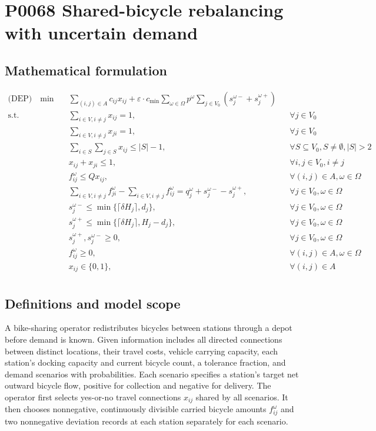 \documentclass[10pt]{article}
\begin{document}
\section*{P0068 Shared-bicycle rebalancing with uncertain demand}
\subsection*{Mathematical formulation}
\begin{align*}
\text{(DEP)} \quad \min \quad & \sum_{(i,j) \in A} c_{ij} x_{ij} + \varepsilon \cdot c_{\min} \sum_{\omega \in \Omega} p^{\omega} \sum_{j \in V_0} (s_{j}^{\omega-} + s_{j}^{\omega+}) \\
\text{s.t.} \quad & \sum_{i \in V, i \neq j} x_{ij} = 1, && \forall j \in V_0 \\
& \sum_{i \in V, i \neq j} x_{ji} = 1, && \forall j \in V_0 \\
& \sum_{i \in S} \sum_{j \in S} x_{ij} \le |S| - 1, && \forall S \subseteq V_0, S \neq \emptyset, |S| > 2 \\
& x_{ij} + x_{ji} \le 1, && \forall i, j \in V_0, i \neq j \\
& f_{ij}^{\omega} \le Q x_{ij}, && \forall (i, j) \in A, \omega \in \Omega \\
& \sum_{i \in V, i \neq j} f_{ji}^{\omega} - \sum_{i \in V, i \neq j} f_{ij}^{\omega} = q_j^{\omega} + s_{j}^{\omega-} - s_{j}^{\omega+}, && \forall j \in V_0, \omega \in \Omega \\
& s_{j}^{\omega-} \le \min\{\lceil \delta H_j \rceil, d_j\}, && \forall j \in V_0, \omega \in \Omega \\
& s_{j}^{\omega+} \le \min\{\lceil \delta H_j \rceil, H_j - d_j\}, && \forall j \in V_0, \omega \in \Omega \\
& s_{j}^{\omega+}, s_{j}^{\omega-} \ge 0, && \forall j \in V_0, \omega \in \Omega \\
& f_{ij}^{\omega} \ge 0, && \forall (i, j) \in A, \omega \in \Omega \\
& x_{ij} \in \{0, 1\}, && \forall (i, j) \in A \\
\end{align*}

\subsection*{Definitions and model scope}
A bike-sharing operator redistributes bicycles between stations through a depot before demand is known. Given information includes all directed connections between distinct locations, their travel costs, vehicle carrying capacity, each station's docking capacity and current bicycle count, a tolerance fraction, and demand scenarios with probabilities. Each scenario specifies a station's target net outward bicycle flow, positive for collection and negative for delivery. The operator first selects yes-or-no travel connections $x_{ij}$ shared by all scenarios. It then chooses nonnegative, continuously divisible carried bicycle amounts $f_{ij}^{\omega}$ and two nonnegative deviation records at each station separately for each scenario.
\end{document}
